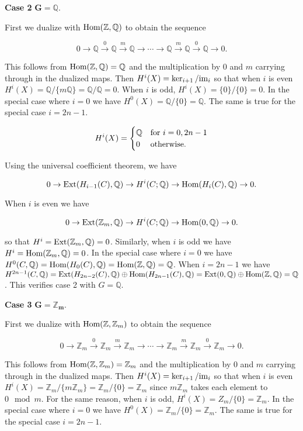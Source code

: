 \documentclass{article}
\newcommand{\Z}{\mathbb{Z}}
\newcommand{\Q}{\mathbb{Q}}
\newcommand{\Hom}{\textnormal{Hom}}
\newcommand{\Ext}{\textnormal{Ext}}
\newcommand{\im}{\textnormal{im}}
\begin{document}
\textbf{Case 2} $\mathbf{G = \Q}$.

First we dualize with $\Hom(\Z, \Q)$ to obtain the sequence

$$0\to \Q\xrightarrow{0} \Q\xrightarrow{m} \Q\to \cdots \to \Q \xrightarrow{m}\Q \xrightarrow{0}\Q\to 0.$$

This follows from $\Hom(\Z, \Q) = \Q$ and the multiplication by 0 and $m$ carrying through in the dualized maps. Then $H^{i}(X) = \ker_{i+1}/\im_{i}$ so that when $i$ is even $H^{i}(X) = \Q/\{m\Q\} = \Q/\Q = 0$. When $i$ is odd, $H^{i}(X) = \{0\}/\{0\} = 0$. In the special case where $i = 0$ we have $H^{0}(X) = \Q/\{0\} = \Q$. The same is true for the special case $i = 2n-1$.

\[H^{i}(X) = \begin{cases} \Q & \textnormal{for } i=0, 2n-1\\
0 & \textnormal{otherwise}. \end{cases}\]
\medskip

Using the universal coefficient theorem, we have

$$0\to \Ext(H_{i-1}(C), \Q)\to H^{i}(C;\Q)\to \Hom(H_{i}(C),\Q)\to 0.$$

When $i$ is even we have

$$0\to \Ext(\Z_{m}, \Q)\to H^{i}(C;\Q)\to \Hom(0,\Q)\to 0.$$

so that $H^{i} = \Ext(\Z_{m},\Q) = 0$. Similarly, when $i$ is odd we have $H^{i} = \Hom(\Z_{m},\Q) = 0$. In the special case where $i = 0$ we have $H^{0}(C, \Q) = \Hom(H_{0}(C), \Q) = \Hom(\Z, \Q) = \Q$. When $i = 2n-1$ we have $H^{2n-1}(C, \Q) = \Ext(H_{2n-2}(C), \Q)\oplus\Hom(H_{2n-1}(C), \Q) = \Ext(0, \Q)\oplus\Hom(\Z, \Q) = \Q$. This verifies case 2 with $G = \Q$.
\bigskip

\textbf{Case 3} $\mathbf{G = \Z_{m}}$.

First we dualize with $\Hom(\Z, \Z_{m})$ to obtain the sequence

$$0\to \Z_{m}\xrightarrow{0} \Z_{m}\xrightarrow{m} \Z_{m}\to \cdots \to \Z_{m} \xrightarrow{m}\Z_{m} \xrightarrow{0}\Z_{m}\to 0.$$

This follows from $\Hom(\Z, \Z_{m}) = \Z_{m}$ and the multiplication by 0 and $m$ carrying through in the dualized maps. Then $H^{i}(X) = \ker_{i+1}/\im_{i}$ so that when $i$ is even $H^{i}(X) = \Z_{m}/\{m\Z_{m}\} = \Z_{m}/\{0\} = \Z_{m}$ since $m\Z_{m}$ takes each element to $0\mod m$. For the same reason, when $i$ is odd, $H^{i}(X) = Z_{m}/\{0\} = \Z_{m}$. In the special case where $i = 0$ we have $H^{0}(X) = \Z_{m}/\{0\} = \Z_{m}$. The same is true for the special case $i = 2n-1$.
\end{document}

